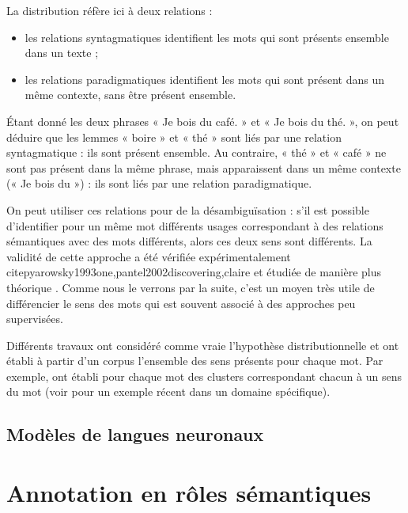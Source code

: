 La distribution réfère ici à deux relations \citep{sahlgren2008distributional}
:

\begin{itemize}

    \item les relations syntagmatiques identifient les mots qui sont présents
        ensemble dans un texte ;

    \item les relations paradigmatiques identifient les mots qui sont présent
        dans un même contexte, sans être présent ensemble.

\end{itemize}

Étant donné les deux phrases « Je bois du café. » et « Je bois du thé. », on
peut déduire que les lemmes « boire » et « thé » sont liés par une relation
syntagmatique : ils sont présent ensemble. Au contraire, « thé » et « café » ne
sont pas présent dans la même phrase, mais apparaissent dans un même contexte
(« Je bois du ») : ils sont liés par une relation paradigmatique.

On peut utiliser ces relations pour de la désambiguïsation : s'il est possible
d'identifier pour un même mot différents usages correspondant à des relations
sémantiques avec des mots différents, alors ces deux sens sont différents. La
validité de cette approche a été vérifiée expérimentalement
citep{yarowsky1993one,pantel2002discovering,claire} et étudiée de manière plus
théorique \citep{sahlgren2006word,sahlgren2008distributional}. Comme nous le
verrons par la suite, c'est un moyen très utile de différencier le sens des
mots qui est souvent associé à des approches peu supervisées.

Différents travaux ont considéré comme vraie l'hypothèse distributionnelle et
ont établi à partir d'un corpus l'ensemble des sens présents pour chaque mot.
Par exemple,
\cite{schutze1998automatic,pantel2002discovering,niu2007three,pedersen2010duluth}
ont établi pour chaque mot des clusters correspondant chacun à un sens du mot
(voir \cite{liu2012semantic} pour un exemple récent dans un domaine
spécifique).

\subsection{Modèles de langues neuronaux}

\section{Annotation en rôles sémantiques}
\label{senssituation}

